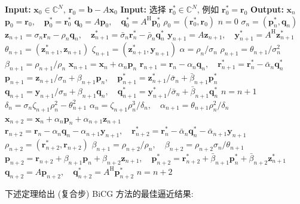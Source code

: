 \begin{algorithm}[H]\caption{{复合步 BiCG 方法}}\label{alg:composite-step-bicg}\begin{algorithmic}[1]
\Statex\textbf{Input:} $\bm x_0\in\mathbb C^N,\ \bm r_0=\bm b-A\bm x_0$
\Statex\textbf{Input:} {选择 $\bm r_0^{*}\in\mathbb C^N$, 例如 $\bm r_0^{*}=\bm r_0$}
\Statex\textbf{Output:} $\bm x_n$
\State $\bm p_0=\bm r_0,\quad\bm p_0^{*}=\bm r_0^{*}$
\State $\bm q_0=A\bm p_0,\quad\bm q_0^{*}=A^{\mathrm H}\bm p_0^{*}$
\State $\rho_0=(\bm r_0^{*},\bm r_0)$
\State $n=0$
\State $\sigma_n=(\bm p_n^{*},\bm q_n)$
\State $\bm z_{n+1}=\sigma_n\bm r_n-\rho_n\bm q_n,\quad\bm z_{n+1}^{*}=\bar\sigma_n\bm r_n^{*}-\bar\rho_n\bm q_n^{*}$
\State $\bm y_{n+1}=A\bm z_{n+1},\quad\bm y_{n+1}^{*}=A^{\mathrm H}\bm z_{n+1}^{*}$
\State $\theta_{n+1}=(\bm z_{n+1}^{*},\bm z_{n+1})$
\State $\zeta_{n+1}=(\bm z_{n+1}^{*},\bm y_{n+1})$
\State $\alpha=\rho_n/\sigma_n$
\State $\rho_{n+1}=\theta_{n+1}/\sigma_n^2$
\State $\beta_{n+1}=\rho_{n+1}/\rho_n$
\State $\bm x_{n+1}=\bm x_n+\alpha_n\bm p_n$
\State $\bm r_{n+1}=\bm r_n-\alpha_n\bm q_n,\quad\bm r_{n+1}^{*}=\bm r_n^{*}-\bar\alpha_n\bm q_n^{*}$
\State $\bm p_{n+1}=\bm z_{n+1}/\sigma_n+\beta_{n+1}\bm p_n,\quad\bm p_{n+1}^{*}=\bm z_{n+1}^{*}/\bar\sigma_n+\bar\beta_{n+1}\bm p_n^{*}$
\State $\bm q_{n+1}=\bm y_{n+1}/\sigma_n+\beta_{n+1}\bm q_n,\quad\bm q_{n+1}^{*}=\bm y_{n+1}^{*}/\bar\sigma_n+\bar\beta_{n+1}\bm q_n^{*}$
\State $n=n+1$
\EndIf
{}
\State $\delta_n=\sigma_n\zeta_{n+1}\rho_n^2-\theta_{n+1}^2$
\State $\alpha_n=\zeta_{n+1}\rho_n^3/\delta_n,\quad\alpha_{n+1}=\theta_{n+1}\rho_n^2/\delta_n$
\State $\bm x_{n+2}=\bm x_n+\alpha_n\bm p_n+\alpha_{n+1}\bm z_{n+1}$
\State $\bm r_{n+2}=\bm r_n-\alpha_n\bm q_n-\alpha_{n+1}\bm y_{n+1},\quad\bm r_{n+2}^{*}=\bm r_n^{*}-\bar\alpha_n\bm q_n^{*}-\bar\alpha_{n+1}\bm y_{n+1}$
\State $\rho_{n+2}=(\bm r_{n+2}^{*},\bm r_{n+2})$
\State $\beta_{n+1}=\rho_{n+2}/\rho_n,\quad\beta_{n+2}=\rho_{n+2}\sigma_n/\theta_{n+1}$
\State $\bm p_{n+2}=\bm r_{n+2}+\beta_{n+1}\bm p_n+\beta_{n+2}\bm z_{n+1},\quad\bm p_{n+2}^{*}=\bm r_{n+2}^{*}+\bar\beta_{n+1}\bm p_n^{*}+\bar\beta_{n+2}\bm z_{n+1}^{*}$
\State $\bm q_{n+2}=A\bm p_{n+2},\quad\bm q_{n+2}^{*}=A^{\mathrm H}\bm p_{n+2}^{*}$
\State $n=n+2$
\EndIf\EndWhile\end{algorithmic}\end{algorithm}
{下述定理给出 (复合步) BiCG 方法的最佳逼近结果:}
\par{}
